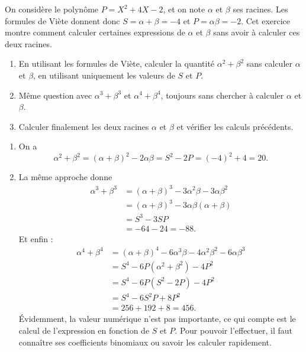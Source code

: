 \begin{exo}
On considère le polynôme $P = X^2+4X-2$, et on note $\alpha$ et $\beta$ ses racines. Les formules de Viète donnent donc $S=\alpha+\beta=-4$ et $P = \alpha\beta=-2$. Cet exercice montre comment calculer certaines expressions de $\alpha$ et $\beta$ sans avoir à calculer ces deux racines.

\begin{enumerate}
\item En utilisant les formules de Viète, calculer la quantité $\alpha^2+\beta^2$  sans calculer $\alpha$ et $\beta$, en utilisant uniquement les valeurs de $S$ et $P$. 
\item Même question avec $\alpha^3+\beta^3$ et $\alpha^4+\beta^4$, toujours sans chercher à calculer $\alpha$ et $\beta$.
\item Calculer finalement les deux racines $\alpha$ et $\beta$  et vérifier les calculs précédents.
\end{enumerate}
\begin{sol}
\begin{enumerate}
\item On a 
\[
\alpha^2+\beta^2 = (\alpha+\beta)^2-2\alpha\beta = \boxed{S^2-2P} = (-4)^2+4 = 20.
\]
\item La même approche donne
\begin{align*}
\alpha^3+\beta^3 
&= (\alpha+\beta)^3-3\alpha^2\beta-3\alpha\beta^2  \\
&= (\alpha+\beta)^3 -3\alpha\beta(\alpha+\beta)\\
&= \boxed{S^3-3SP}\\
& = -64-24=-88.
\end{align*}
Et enfin : 
\begin{align*}
\alpha^4+\beta^4 
&= (\alpha+\beta)^4-6\alpha^3\beta-4\alpha^2\beta^2 -6\alpha\beta^3\\
&= S^4 - 6P(\alpha^2+\beta^2)-4P^2\\
&= S^4 - 6P(S^2-2P) - 4P^2\\
&= \boxed{S^4 - 6S^2P + 8P^2}\\
&= 256+192+8 = 456.
\end{align*}
Évidemment, la valeur numérique n'est pas importante, ce qui compte est le calcul de l'expression en fonction de $S$ et $P$. Pour pouvoir l'effectuer, il faut connaître ses coefficients binomiaux ou savoir les calculer rapidement.
\end{enumerate}
\end{sol}
\end{exo}

